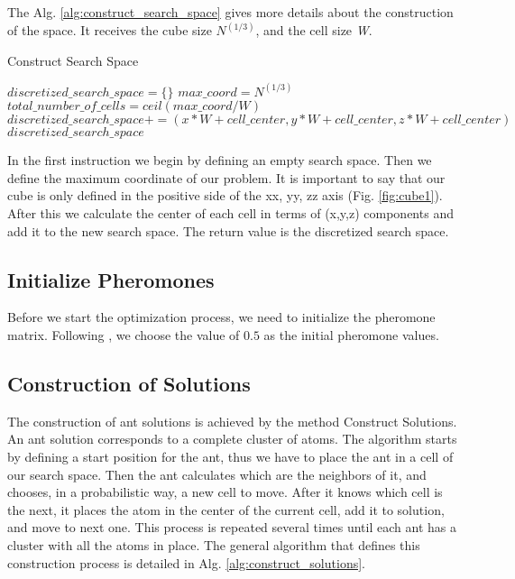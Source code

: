 	
	\pagebreak
	The Alg. \ref{alg:construct_search_space} gives more details about the construction of the space. It receives the cube size $N^{(1/3)}$, and the cell size \emph{W}.
	
	\begin{algorithm}
		\caption{Construct Search Space}
		\label{alg:construct_search_space}
		\begin{algorithmic}
		\STATE $discretized\_search\_space = \{\}$
		\STATE $max\_coord = N^{(1/3)}$
		\STATE $total\_number\_of\_cells = ceil(max\_coord / W)$
					\STATE $discretized\_search\_space += (x * W + cell\_center,  y * W + cell\_center, z * W + cell\_center)$
				\ENDFOR
			\ENDFOR
		\ENDFOR
		\RETURN $discretized\_search\_space$
		\end{algorithmic}
	\end{algorithm}

	In the first instruction we begin by defining an empty search space. Then we define the maximum coordinate of our problem. It is important to say that our cube is only defined in the positive side of the xx, yy, zz axis (Fig. \ref{fig:cube1}). After this we calculate the center of each cell in terms of (x,y,z) components and add it to the new search space. 
	The return value is the discretized search space.
	
	\subsection{Initialize Pheromones}
	Before we start the optimization process, we need to initialize the pheromone matrix. Following \cite{blum04}, we choose the value of $0.5$ as the initial pheromone values.

	\subsection{Construction of Solutions}
	The construction of ant solutions is achieved by the method Construct Solutions. An ant solution corresponds to a complete cluster of atoms. The algorithm starts by defining a start position for the ant, thus we have to place the ant in a cell of our search space. Then the ant calculates which are the neighbors of it, and chooses, in a probabilistic way, a new cell to move. After it knows which cell is the next, it places the atom in the center of the current cell, add it to solution, and move to next one. This process is repeated several times until each ant has a cluster with all the atoms in place. The general algorithm that defines this construction process is detailed in Alg. \ref{alg:construct_solutions}.
	
